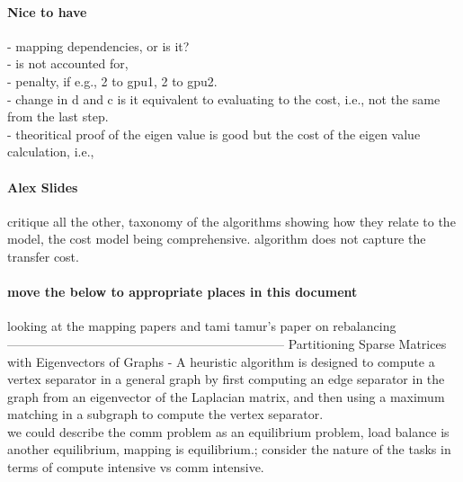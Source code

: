\documentclass{article}
\begin{document}
\paragraph{Nice to have}
	- mapping dependencies, or is it? \\
		- is not accounted for, \\
		- penalty, if e.g., 2 to gpu1, 2 to gpu2.\\
	- change in d and c is it equivalent to evaluating to the cost, i.e., not the same from the last step.\\
	- theoritical proof of the eigen value is good but the cost of the eigen value calculation, i.e., \\ 


\paragraph{Alex Slides}
critique all the  other, taxonomy of the algorithms showing how they relate to the model, the cost model being comprehensive. 
algorithm does not capture the transfer cost. 


\paragraph{move the below to appropriate places in this document}
looking at the mapping papers and tami tamur's paper on rebalancing
------------------------------------------------------------------
Partitioning Sparse Matrices with Eigenvectors of Graphs - A heuristic algorithm is designed to compute a vertex separator in a general graph by first computing an edge separator in the graph from an eigenvector of the Laplacian matrix, and then using a maximum matching in a subgraph to compute the vertex separator. \\

we could describe the comm problem as an equilibrium problem, load balance is another equilibrium, mapping is equilibrium.; consider the nature of the tasks in terms of compute intensive vs comm intensive.\\


\printbibliography
\end{document}
